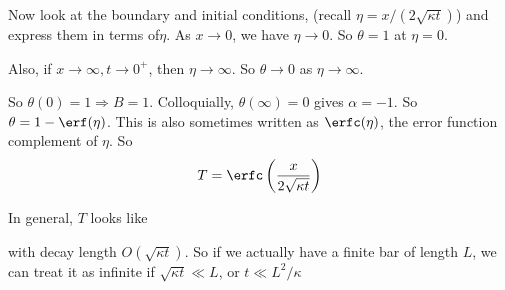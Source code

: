 \documentclass[a4paper]{article}
\begin{document}
\begin{eg}
Now look at the boundary and initial conditions, (recall $\eta = x/(2\sqrt{\kappa t})$) and express them in terms of$\eta$. As $x \to 0$, we have $\eta \to 0$. So $\theta = 1$ at $\eta = 0$.

Also, if $x\to \infty, t\to 0^+$, then $\eta \to \infty$. So $\theta \to 0$ as $\eta \to \infty$.

So $\theta(0) = 1 \Rightarrow B = 1$. Colloquially, $\theta(\infty) = 0$ gives $\alpha = -1$. So $\theta = 1 - \erf(\eta)$. This is also sometimes written as $\erfc(\eta)$, the error function complement of $\eta$. So
\[
T = \erfc\left(\frac{x}{2\sqrt{\kappa t}}\right)
\]

In general, $T$ looks like


with decay length $O(\sqrt{\kappa t})$. So if we actually have a finite bar of length $L$, we can treat it as infinite if $\sqrt{\kappa t} \ll L$, or $t\ll L^2/\kappa$
\end{eg}
\end{document}

